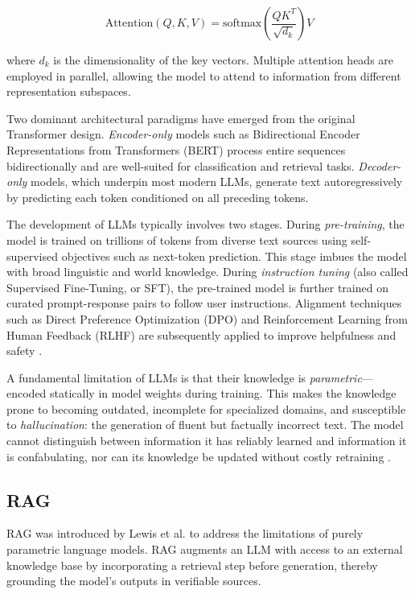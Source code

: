 \begin{equation}
\text{Attention}(Q, K, V) = \text{softmax}\left(\frac{QK^T}{\sqrt{d_k}}\right) V
\label{eq:attention}
\end{equation}

\noindent where $d_k$ is the dimensionality of the key vectors. Multiple attention heads are employed in parallel, allowing the model to attend to information from different representation subspaces.

Two dominant architectural paradigms have emerged from the original Transformer design. \textit{Encoder-only} models such as Bidirectional Encoder Representations from Transformers (BERT) process entire sequences bidirectionally and are well-suited for classification and retrieval tasks. \textit{Decoder-only} models, which underpin most modern LLMs, generate text autoregressively by predicting each token conditioned on all preceding tokens.

The development of LLMs typically involves two stages. During \textit{pre-training}, the model is trained on trillions of tokens from diverse text sources using self-supervised objectives such as next-token prediction. This stage imbues the model with broad linguistic and world knowledge. During \textit{instruction tuning} (also called Supervised Fine-Tuning, or SFT), the pre-trained model is further trained on curated prompt-response pairs to follow user instructions. Alignment techniques such as Direct Preference Optimization (DPO) and Reinforcement Learning from Human Feedback (RLHF) are subsequently applied to improve helpfulness and safety \cite{song_2024_a}.

A fundamental limitation of LLMs is that their knowledge is \textit{parametric}---encoded statically in model weights during training. This makes the knowledge prone to becoming outdated, incomplete for specialized domains, and susceptible to \textit{hallucination}: the generation of fluent but factually incorrect text. The model cannot distinguish between information it has reliably learned and information it is confabulating, nor can its knowledge be updated without costly retraining \cite{lewis_2021_retrievalaugmented}.

\subsection{RAG}
\label{sec:rag}

RAG was introduced by Lewis et al. \cite{lewis_2021_retrievalaugmented} to address the limitations of purely parametric language models. RAG augments an LLM with access to an external knowledge base by incorporating a retrieval step before generation, thereby grounding the model's outputs in verifiable sources.

